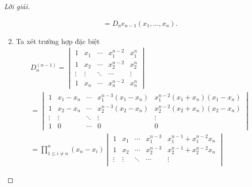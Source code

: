 \documentclass[class=nhvh-linear-algebra,crop=false]{standalone}
\begin{document}
\begin{proof}[Lời giải]
\begin{enumerate}[label = (\alph*)]
\begin{align*}
                              & = D_{n}e_{n-1}(x_{1},\ldots, x_{n}).
              \end{align*}
              \endgroup{}
        \item
              \par Ta xét trường hợp đặc biệt
              \begin{align*}
                   & D^{(n-1)}_{n} =
                  \begin{vmatrix}
                      1      & x_{1}  & \cdots & x_{1}^{n-2} & x_{1}^{n} \\
                      1      & x_{2}  & \cdots & x_{2}^{n-2} & x_{2}^{n} \\
                      \vdots & \vdots & \ddots & \cdots      & \vdots    \\
                      1      & x_{n}  & \cdots & x_{n}^{n-2} & x_{n}^{n}
                  \end{vmatrix}                                                                                                                                                                                 \\
                   & =
                  \begin{vmatrix}
                      1      & x_{1} - x_{n} & \cdots & x_{1}^{n-3}(x_{1} - x_{n}) & x_{1}^{n-2}(x_{1} + x_{n})(x_{1} - x_{n}) \\
                      1      & x_{2} - x_{n} & \cdots & x_{2}^{n-3}(x_{2} - x_{n}) & x_{2}^{n-2}(x_{2} + x_{n})(x_{2} - x_{n}) \\
                      \vdots & \vdots        & \ddots & \vdots                     & \vdots                                    \\
                      1      & 0             & \cdots & 0                          & 0
                  \end{vmatrix}                                                                                                                           \\
                   & = \prod^{n}_{1\le i\ne n}(x_{n} - x_{i})
                  \begin{vmatrix}
                      1      & x_{1}   & \cdots & x_{1}^{n-3}   & x_{1}^{n-1} + x_{1}^{n-2}x_{n}     \\
                      1      & x_{2}   & \cdots & x_{2}^{n-3}   & x_{2}^{n-1} + x_{2}^{n-2}x_{n}     \\
                      \vdots & \vdots  & \ddots & \cdots        & \vdots                             \\

\end{vmatrix}
\end{align*}
\end{enumerate}
\end{proof}
\end{document}
